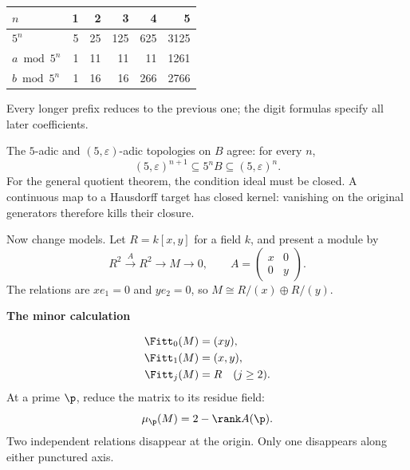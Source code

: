 \begin{center}\small
\begin{tabular}{@{}lrrrrr@{}}\toprule
$n$ & 1 & 2 & 3 & 4 & 5\\\midrule
$5^n$ & 5 & 25 & 125 & 625 & 3125\\
$a\bmod5^n$ & 1 & 11 & 11 & 11 & 1261\\
$b\bmod5^n$ & 1 & 16 & 16 & 266 & 2766\\\bottomrule
\end{tabular}
\end{center}
Every longer prefix reduces to the previous one; the digit formulas specify all later coefficients.

The $5$-adic and $(5,\varepsilon)$-adic topologies on $B$ agree: for every $n$,
\[
(5,\varepsilon)^{n+1}\subseteq 5^nB\subseteq(5,\varepsilon)^n.
\]
For the general quotient theorem, the condition ideal must be closed. A continuous map to a Hausdorff target has closed kernel: vanishing on the original generators therefore kills their closure.



Now change models. Let $R=k[x,y]$ for a field $k$, and present a module by
\[
R^2\xrightarrow{A}R^2\longrightarrow M\longrightarrow0,
\qquad
A=\begin{pmatrix}x&0\\0&y\end{pmatrix}.
\]
The relations are $xe_1=0$ and $ye_2=0$, so $M\cong R/(x)\oplus R/(y)$.

\begin{minipage}[c]{.48\linewidth}
\end{minipage}\hfill
\begin{minipage}[c]{.48\linewidth}
{\sffamily\bfseries The minor calculation}\par
\[
\begin{aligned}
\Fitt_0(M)&=(xy),\\
\Fitt_1(M)&=(x,y),\\
\Fitt_j(M)&=R\quad(j\ge2).
\end{aligned}
\]
At a prime $\p$, reduce the matrix to its residue field:
\[
\mu_{\p}(M)=2-\rank A(\p).
\]
Two independent relations disappear at the origin. Only one disappears along either punctured axis.
\end{minipage}

